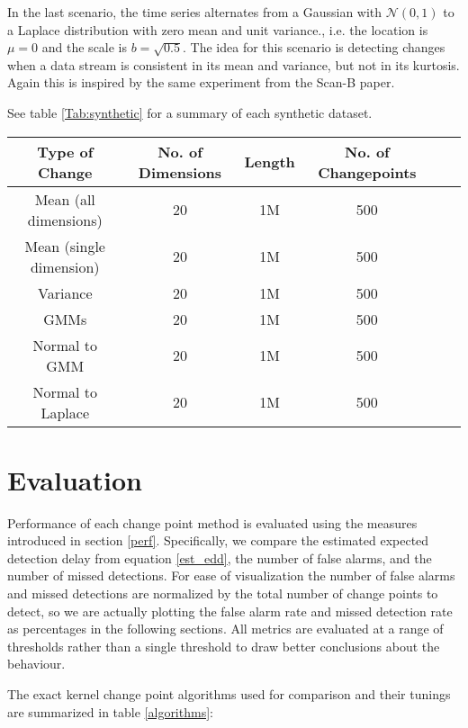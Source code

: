 In the last scenario, the time series alternates from a Gaussian with $\mathcal{N}(0,1)$ to a Laplace distribution with zero mean and unit variance., i.e. the location is $\mu=0$ and the scale is $b=\sqrt{0.5}$. The idea for this scenario is detecting changes when a data stream is consistent in its mean and variance, but not in its kurtosis. Again this is inspired by the same experiment from the Scan-B paper.

See table \ref{Tab:synthetic} for a summary of each synthetic dataset.

\begin{center}
\begin{tabular}{SSSSSS} \toprule
    {Type of Change} & {No. of Dimensions} & {Length} & {No. of Changepoints}  \\ \midrule
    {Mean (all dimensions)}  & 20 & {1M} & 500  \\
    {Mean (single dimension)}  & 20 & {1M} & 500  \\
    {Variance}  & 20 & {1M} & 500  \\
    {GMMs}  & 20 & {1M}  & 500  \\ 
    {Normal to GMM}  & 20 & {1M}  & 500  \\ 
    {Normal to Laplace} & 20 & {1M}  & 500  \\ \bottomrule
\end{tabular}
 \label{Tab:synthetic}
\end{center}

\section{Evaluation}
\label{eval}
Performance of each change point method is evaluated using the measures introduced in section \ref{perf}. Specifically, we compare the estimated expected detection delay from equation \ref{est_edd}, the number of false alarms, and the number of missed detections. For ease of visualization the number of false alarms and missed detections are normalized by the total number of change points to detect, so we are actually plotting the false alarm rate and missed detection rate as percentages in the following sections. All metrics are evaluated at a range of thresholds rather than a single threshold to draw better conclusions about the behaviour.

The exact kernel change point algorithms used for comparison and their tunings are summarized in table \ref{algorithms}:

